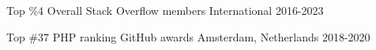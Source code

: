 



\begin{cvhonors}

  \cvhonor
    {Top \%4} %
    {Overall Stack Overflow members} %
    {International} %
    {2016-2023} %

  \cvhonor
    {Top \#37} %
    {PHP ranking GitHub awards} %
    {Amsterdam, Netherlands} %
    {2018-2020} %

\end{cvhonors}
